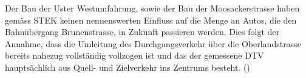 Der Bau der Uster Westumfahrung, sowie der Bau der Moosackerstrasse haben gemäss STEK keinen nennenswerten Einfluss auf die Menge an Autos, die den Bahnübergang Brunenstrasse, in Zukunft passieren werden. Dies folgt der Annahme, dass die Umleitung des Durchgangsverkehr über die Oberlandstrasse bereits nahezug vollständig vollzogen ist und das der gemessene DTV hauptsächlich aus Quell- und Zielverkehr ins Zentrums besteht.  (\cite{STEK})

\newpage


%

